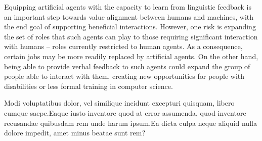 \documentclass[letterpaper]{article} %
\begin{document}
Equipping artificial agents with the capacity to learn from linguistic feedback is an important step towards value alignment between humans and machines, with the end goal of supporting beneficial interactions. However, one risk is expanding the set of roles that such agents can play to those requiring significant interaction with humans --  roles currently restricted to human agents. As a consequence, certain jobs may be more readily replaced by artificial agents. On the other hand, being able to provide verbal feedback to such agents could expand the group of people able to interact with them, creating new opportunities for people with disabilities or less formal training in computer science.

\small  Modi voluptatibus dolor, vel similique incidunt excepturi quisquam, libero cumque saepe.Eaque iusto inventore quod at error assumenda, quod inventore recusandae quibusdam rem unde harum ipsum.Ea dicta culpa neque aliquid nulla dolore impedit, amet minus beatae sunt rem?\clearpage

\end{document}
